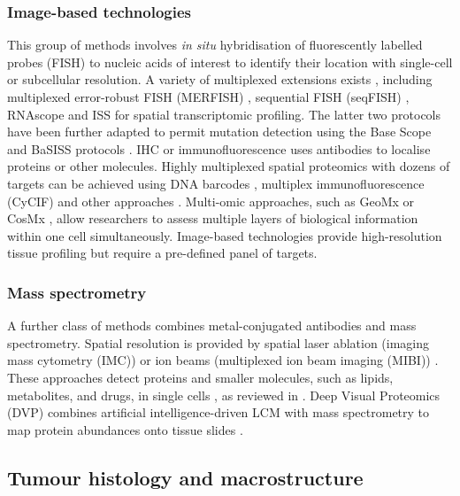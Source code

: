 {    \subsubsection*{Image-based technologies}
    This group of methods involves \textit{in situ} hybridisation of fluorescently labelled probes (FISH) to nucleic acids of interest to identify their location with single-cell or subcellular resolution. A variety of multiplexed extensions exists \parencite{Chen2015-ab,Lyubimova2013-jd,Chen2016-if,Coskun2016-jr,Codeluppi2018-nd,Wang2018-sl, Lee2015-ge,Qian2020-mp,Chen2018-dg,Alon2021-ce,Gyllborg2020-uq}, including multiplexed error-robust FISH (MERFISH) \parencite{Su2020-fb,Lu2022-yq}, sequential FISH (seqFISH) \parencite{Eng2019-rx}, RNAscope \parencite{Wang2012-pv} and \ac{ISS} \parencite{Ke2013-ux} for spatial transcriptomic profiling. The latter two protocols have been further adapted to permit mutation detection using the Base Scope \parencite{Baker2017-dv} and \ac{BaSISS} protocols \parencite{Lomakin2022-ks}. \acf{IHC} or immunofluorescence uses antibodies to localise proteins or other molecules. Highly multiplexed spatial proteomics with dozens of targets can be achieved using DNA barcodes \parencite{Goltsev2018-dd,Saka2019-lb}, multiplex immunofluorescence (CyCIF) \parencite{Lin2018-qf} and other approaches \parencite{Lin2015-ml,Gerdes2013-kn,Keren2019-cu}. Multi-omic approaches, such as GeoMx or CosMx \parencite{He2022-ee,Bergholtz2021-ql}, allow researchers to assess multiple layers of biological information within one cell simultaneously. Image-based technologies provide high-resolution tissue profiling but require a pre-defined panel of targets.
    \subsubsection*{Mass spectrometry}
    A further class of methods combines metal-conjugated antibodies and mass spectrometry. Spatial resolution is provided by spatial laser ablation (imaging mass cytometry (IMC)) \parencite{Giesen2014-yd} or ion beams (multiplexed ion beam imaging (MIBI)) \parencite{Angelo2014-gf}. These approaches detect proteins and smaller molecules, such as lipids, metabolites, and drugs, in single cells \parencite{Giesen2014-yd}, as reviewed in \textcite{Mund2022-kf}. Deep Visual Proteomics (DVP) combines artificial intelligence-driven \acs{LCM} with mass spectrometry to map protein abundances onto tissue slides \parencite{Mund2022-fw}.}

\subsection*{Tumour histology and macrostructure}

